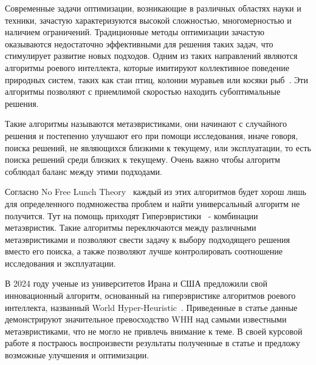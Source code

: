 \documentclass[a4paper,12pt]{extarticle}
\begin{document}
Современные задачи оптимизации, возникающие в различных областях науки и техники, зачастую характеризуются высокой сложностью, многомерностью и наличием ограничений. Традиционные методы оптимизации зачастую оказываются недостаточно эффективными для решения таких задач, что стимулирует развитие новых подходов. Одним из таких направлений являются алгоритмы роевого интеллекта, которые имитируют коллективное поведение природных систем, таких как стаи птиц, колонии муравьев или косяки рыб~\cite{trivedi_varshney}. Эти алгоритмы позволяют с приемлимой скоростью находить субоптимальные решения.

Такие алгоритмы называются метаэвристиками, они начинают с случайного решения и постепенно улучшают его при помощи исследования, иначе говоря, поиска решений, не являющихся близкими к текущему, или эксплуатации, то есть поиска решений среди близких к текущему. Очень важно чтобы алгоритм соблюдал баланс между этими подходами.

Согласно No Free Lunch Theory~\cite{nofreelunch} каждый из этих алгоритмов будет хорош лишь для определенного подмножества проблем и найти универсальный алгоритм не получится. Тут на помощь приходят Гиперэвристики~\cite{burke_etal_2019} - комбинации метаэвристик. Такие алгоритмы переключаются между различными метаэвристиками и позволяют свести задачу к выбору подходящего решения вместо его поиска, а также позволяют лучше контролировать соотношение исследования и эксплуатации.

В 2024 году ученые из университетов Ирана и США предложили свой инновационный алгоритм, основанный на гиперэвристике алгоритмов роевого интеллекта, названный World Hyper-Heuristic~\cite{WHH}. Приведенные в статье данные демонстрируют значительное превосходство WHH над самыми известными метаэвристиками, что не могло не привлечь внимание к теме. В своей курсовой работе я постраюсь воспроизвести результаты полученные в статье и предложу возможные улучшения и оптимизации.
	
\newpage 
\printbibliography[heading=bibintoc] 

	
\newpage
\end{document}
